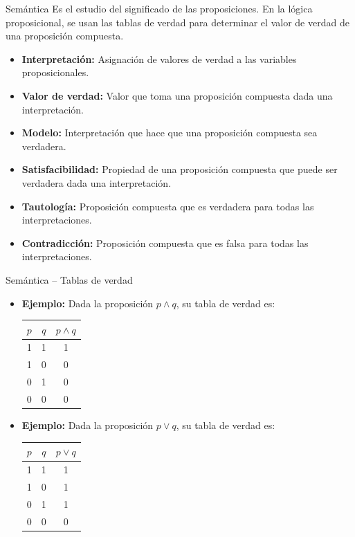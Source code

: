 \documentclass[dvisvgm,hypertex,aspectratio=169]{beamer}
\begin{document}
\begin{frame}{Semántica}
  Es el estudio del significado de las proposiciones. En la lógica proposicional, se usan las tablas de verdad para determinar el valor de verdad de una proposición compuesta.
  \begin{itemize}[<+->]
    \item \textbf{Interpretación:} Asignación de valores de verdad a las variables proposicionales.
    \item \textbf{Valor de verdad:} Valor que toma una proposición compuesta dada una interpretación.
    \item \textbf{Modelo:} Interpretación que hace que una proposición compuesta sea verdadera.
    \item \textbf{Satisfacibilidad:} Propiedad de una proposición compuesta que puede ser verdadera dada una interpretación.
    \item \textbf{Tautología:} Proposición compuesta que es verdadera para todas las interpretaciones.
    \item \textbf{Contradicción:} Proposición compuesta que es falsa para todas las interpretaciones.
  \end{itemize}
\end{frame}
\begin{frame}{Semántica -- Tablas de verdad}
  \begin{itemize}[<+->]
    \item \textbf{Ejemplo:} Dada la proposición $p \land q$, su tabla de verdad es:
    \begin{table}[h]
      \centering
      \begin{tabular}{|c|c|c|}
        \hline
        $p$ & $q$ & $p \land q$ \\ \hline
        1 & 1 & 1 \\ \hline
        1 & 0 & 0 \\ \hline
        0 & 1 & 0 \\ \hline
        0 & 0 & 0 \\ \hline
      \end{tabular}
    \end{table}
    \item \textbf{Ejemplo:} Dada la proposición $p \lor q$, su tabla de verdad es:
    \begin{table}[h]
      \centering
      \begin{tabular}{|c|c|c|}
        \hline
        $p$ & $q$ & $p \lor q$ \\ \hline
        1 & 1 & 1 \\ \hline
        1 & 0 & 1 \\ \hline
        0 & 1 & 1 \\ \hline
        0 & 0 & 0 \\ \hline
      \end{tabular}
    \end{table}
  \end{itemize}
\end{frame}
\end{document}
